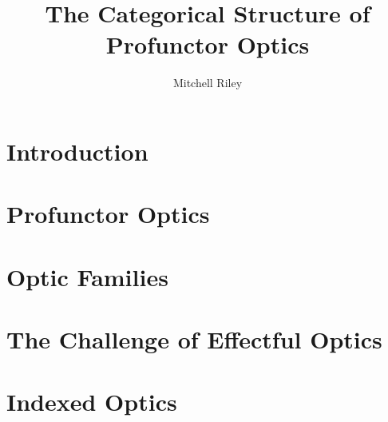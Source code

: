 \documentclass[11pt,a4paper]{amsart}
\title{The Categorical Structure of Profunctor Optics}
\author{Mitchell Riley}
\theoremstyle{plain}
\theoremstyle{definition}
\begin{document}
\maketitle

\section{Introduction}
\section{Profunctor Optics}
\section{Optic Families}
\section{The Challenge of Effectful Optics}
\section{Indexed Optics}

\nocite{*}


\end{document}
